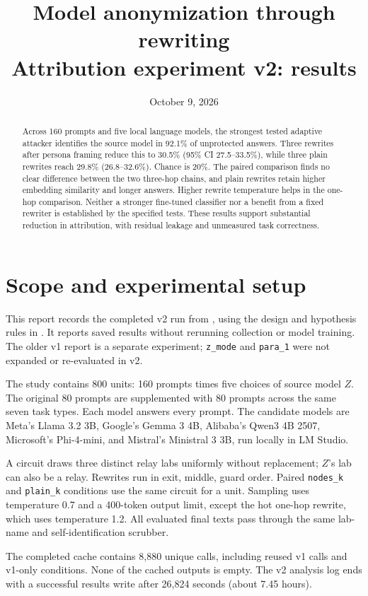 \documentclass[11pt]{article}
\title{\textbf{Model anonymization through rewriting}\\[4pt]\large Attribution experiment v2: results}
\author{}
\date{October 9, 2026}
\newcommand{\cond}[1]{\texttt{#1}}
\begin{document}
\maketitle
\begin{abstract}
\noindent
Across 160 prompts and five local language models, the strongest tested adaptive
attacker identifies the source model in 92.1\% of unprotected answers. Three
rewrites after persona framing reduce this to 30.5\% (95\% CI 27.5--33.5\%),
while three plain rewrites reach 29.8\% (26.8--32.6\%). Chance is 20\%.
The paired comparison finds no clear difference between the two three-hop
chains, and plain rewrites retain higher embedding similarity and longer
answers. Higher rewrite temperature helps in the one-hop comparison. Neither
a stronger fine-tuned classifier nor a benefit from a fixed rewriter is
established by the specified tests. These results support substantial
reduction in attribution, with residual leakage and unmeasured task correctness.
\end{abstract}

\section{Scope and experimental setup}
This report records the completed v2 run from
, using the design and hypothesis rules
in . It reports saved results without rerunning
collection or model training. The older v1 report is a separate experiment;
\cond{z\_mode} and \cond{para\_1} were not expanded or re-evaluated in v2.

The study contains 800 units: 160 prompts times five choices of source model
$Z$. The original 80 prompts are supplemented with 80 prompts across the same
seven task types. Each model answers every prompt. The candidate models are
Meta's Llama 3.2 3B, Google's Gemma 3 4B, Alibaba's Qwen3 4B 2507,
Microsoft's Phi-4-mini, and Mistral's Ministral 3 3B, run locally in LM Studio.

A circuit draws three distinct relay labs uniformly without replacement; $Z$'s
lab can also be a relay. Rewrites run in exit, middle, guard order. Paired
\cond{nodes\_k} and \cond{plain\_k} conditions use the same circuit for a unit.
Sampling uses temperature 0.7 and a 400-token output limit, except the hot
one-hop rewrite, which uses temperature 1.2. All evaluated final texts pass
through the same lab-name and self-identification scrubber.

The completed cache contains 8,880 unique calls, including reused v1 calls and
v1-only conditions. None of the cached outputs is empty. The v2 analysis log
ends with a successful results write after 26,824 seconds (about 7.45 hours).
\end{document}
